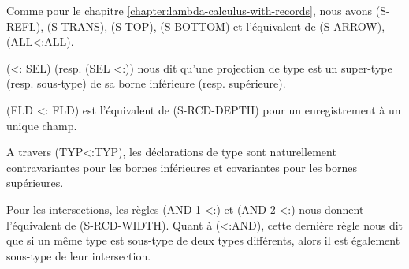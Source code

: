 
Comme pour le chapitre \ref{chapter:lambda-calculus-with-records}, nous
avons (S-REFL), (S-TRANS), (S-TOP), (S-BOTTOM) et l'équivalent de (S-ARROW), (ALL<:ALL).

(<: SEL) (resp. (SEL <:)) nous dit qu'une projection de type est un super-type (resp.
sous-type) de sa borne inférieure (resp. supérieure).

(FLD <: FLD) est l'équivalent de (S-RCD-DEPTH) pour un enregistrement à un
unique champ.

A travers (TYP<:TYP), les déclarations de type sont naturellement contravariantes
pour les bornes inférieures et covariantes pour les bornes supérieures.

Pour les intersections, les règles (AND-1-<:) et (AND-2-<:) nous donnent
l'équivalent de (S-RCD-WIDTH). Quant à (<:AND), cette dernière règle nous dit
que si un même type est sous-type de deux types différents, alors il est
également sous-type de leur intersection.

